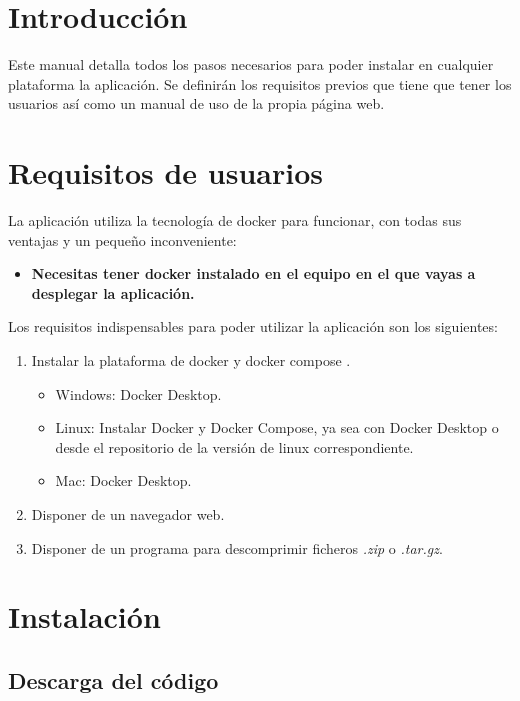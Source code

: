 
\section{Introducción}

Este manual detalla todos los pasos necesarios para poder instalar en cualquier plataforma la aplicación. Se definirán los requisitos previos que tiene que tener los usuarios así como un manual de uso de la propia página web.

\section{Requisitos de usuarios}

La aplicación utiliza la tecnología de docker para funcionar, con todas sus ventajas y un pequeño inconveniente:

\begin{itemize}
	\item \textbf{Necesitas tener docker instalado en el equipo en el que vayas a desplegar la aplicación.}
\end{itemize}

Los requisitos indispensables para poder utilizar la aplicación son los siguientes:

\begin{enumerate}
	\item Instalar la plataforma de docker \cite{web:dockerDesktop} y docker compose \cite{web:dockercompose}.
	\begin{itemize}
		\item Windows: Docker Desktop.
		\item Linux: Instalar Docker y Docker Compose, ya sea con Docker Desktop o desde el repositorio de la versión de linux correspondiente.
		\item Mac: Docker Desktop.
	\end{itemize}
	\item Disponer de un navegador web.
	\item Disponer de un programa para descomprimir ficheros \textit{.zip} o \textit{.tar.gz}.
\end{enumerate}

\section{Instalación}

\subsection{Descarga del código}


